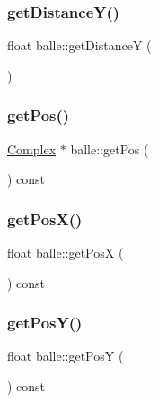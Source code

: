 \subsubsection{\texorpdfstring{get\+Distance\+Y()}{getDistanceY()}}
{\footnotesize\ttfamily float balle\+::get\+DistanceY (\begin{DoxyParamCaption}{ }\end{DoxyParamCaption})}

\mbox{\label{classballe_aa06115d8837256988e7ab9993f47ac6f}} 
\subsubsection{\texorpdfstring{get\+Pos()}{getPos()}}
{\footnotesize\ttfamily \hyperlink{classComplex}{Complex} $\ast$ balle\+::get\+Pos (\begin{DoxyParamCaption}{ }\end{DoxyParamCaption}) const}

\mbox{\label{classballe_a1e62142738138ef4b0fc6fe97c18ea70}} 
\subsubsection{\texorpdfstring{get\+Pos\+X()}{getPosX()}}
{\footnotesize\ttfamily float balle\+::get\+PosX (\begin{DoxyParamCaption}{ }\end{DoxyParamCaption}) const}

\mbox{\label{classballe_a44f9ef55a50756bf8414e407b2670132}} 
\subsubsection{\texorpdfstring{get\+Pos\+Y()}{getPosY()}}
{\footnotesize\ttfamily float balle\+::get\+PosY (\begin{DoxyParamCaption}{ }\end{DoxyParamCaption}) const}

\mbox{\label{classballe_a9ca7c6c93dcc2334718e21a1c9ee2b86}} 

